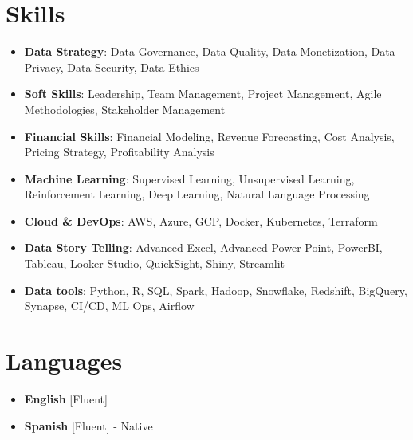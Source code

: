 \documentclass[11pt,a4paper,sans]{moderncv}
\begin{document}
\vspace{-1.5em}

\section{Skills}
\begin{itemize}[label=\textbullet, itemsep=-0.2em]
\item \textbf{Data Strategy}: Data Governance, Data Quality, Data Monetization, Data Privacy, Data Security, Data Ethics
\item \textbf{Soft Skills}: Leadership, Team Management, Project Management, Agile Methodologies, Stakeholder Management
\item \textbf{Financial Skills}: Financial Modeling, Revenue Forecasting, Cost Analysis, Pricing Strategy, Profitability Analysis
\item \textbf{Machine Learning}: Supervised Learning, Unsupervised Learning, Reinforcement Learning, Deep Learning, Natural Language Processing
\item \textbf{Cloud \& DevOps}: AWS, Azure, GCP, Docker, Kubernetes, Terraform
\item \textbf{Data Story Telling}: Advanced Excel, Advanced Power Point, PowerBI, Tableau, Looker Studio, QuickSight, Shiny, Streamlit
\item \textbf{Data tools}: Python, R, SQL, Spark, Hadoop, Snowflake, Redshift, BigQuery, Synapse, CI/CD, ML Ops, Airflow
\end{itemize}


\vspace{-1.5em}

\section{Languages}
\begin{multicols}{2}
\begin{itemize}[label=\textbullet, itemsep=-0.2em]
\item \textbf{English} [Fluent]
\item \textbf{Spanish} [Fluent] - Native
\end{itemize}
\end{multicols}
\end{document}
